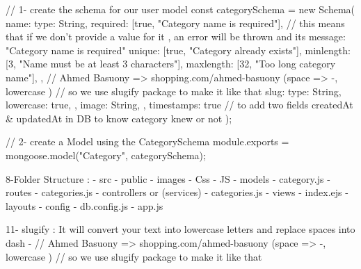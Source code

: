                                                 // 1- create the schema for our user model
                                                const categorySchema = new Schema(
                                                {
                                                    name: {
                                                    type: String,
                                                    required: [true, "Category  name is required"], //  this means that if we don't provide a value for it , an error will be thrown and its message: "Category  name is required"
                                                    unique: [true, "Category  already exists"],
                                                    minlength: [3, "Name must be at least 3 characters"],
                                                    maxlength: [32, "Too long category name"],
                                                    },
                                                    // Ahmed Basuony => shopping.com/ahmed-basuony  (space => -, lowercase )
                                                    // so we use slugify package  to make it like that
                                                    slug: {
                                                    type: String,
                                                    lowercase: true,
                                                    },
                                                    image: String,
                                                },
                                                { timestamps: true } // to add two fields  createdAt & updatedAt in DB to know category knew  or not
                                                );

                                                //  2- create a Model using the CategorySchema
                                                module.exports = mongoose.model("Category", categorySchema);


8-Folder Structure : 
        - src
            - public
                - images
                - Css
                - JS
              - models
                   - category.js
              - routes
                   - categories.js
              - controllers or (services)
                      - categories.js
              - views
                      - index.ejs
                      - layouts
              - config 
                       - db.config.js
              - app.js




11- slugify  : It will convert your text into lowercase letters and replace spaces into dash -
            // Ahmed Basuony => shopping.com/ahmed-basuony  (space => -, lowercase )
            // so we use slugify package  to make it like that
    
